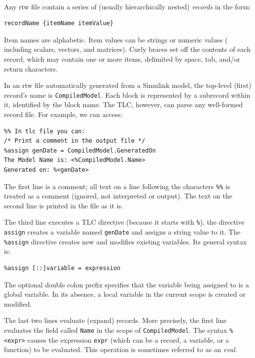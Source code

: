 \paragraph{} Any rtw file contain a series of (usually hierarchically nested) \emph{records} in the form:
\begin{verbatim}
recordName {itemName itemValue}
\end{verbatim}
Item names are alphabetic. Item values can be strings or numeric values ( including scalars, vectors, and matrices). Curly braces set off the contents of each record, which may contain one or more items, delimited by space, tab, and/or return characters.
\par In an rtw file automatically generated from a Simulink model, the top-level (first) record’s name is \verb|CompiledModel|. Each block is represented by a subrecord within it, identified by the block name. The TLC, however, can parse any well-formed record file. For example, we can access:
\begin{lstlisting}
%% In tlc file you can:
/* Print a comment in the output file */
%assign genDate = CompiledModel.GeneratedOn
The Model Name is: <%CompiledModel.Name>
Generated on: %<genDate>
\end{lstlisting}
The first line is a comment; all text on a line following the characters \verb|%%| is treated as a comment (ignored, not interpreted or output). The text on the second line is printed in the file as it is.
\par The third line executes a TLC directive (because it starts with \verb|%|), the directive \verb|assign| creates a variable named \verb|genDate| and assigns a string value to it. The \verb|%assign| directive creates new and modifies existing variables. Its general
syntax is:
\begin{verbatim}
%assign [::]variable = expression
\end{verbatim}
The optional double colon prefix specifies that the variable being assigned to is a global variable. In its absence, a local variable in the current scope is created or modified.
\par The last two lines evaluate (expand) records. More precisely, the first line evaluates the field called \verb|Name| in the scope of \verb|CompiledModel|. The syntax \verb|%<expr>| causes the expression \verb|expr| (which can be a record, a variable, or a function) to be evaluated. This operation is sometimes referred to as an \emph{eval}.

